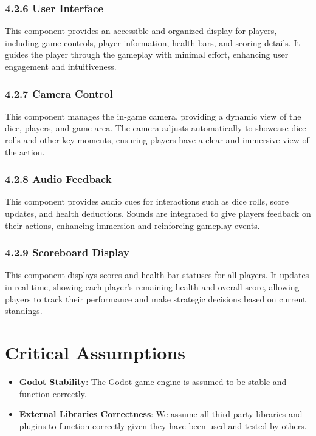 \documentclass{article}
\begin{document}
\subsubsection*{4.2.6 User Interface}
This component provides an accessible and organized display for players, including game controls, player information, health bars, and scoring details. It guides the player through the gameplay with minimal effort, enhancing user engagement and intuitiveness.

\subsubsection*{4.2.7 Camera Control}
This component manages the in-game camera, providing a dynamic view of the dice, players, and game area. The camera adjusts automatically to showcase dice rolls and other key moments, ensuring players have a clear and immersive view of the action.

\subsubsection*{4.2.8 Audio Feedback}
This component provides audio cues for interactions such as dice rolls, score updates, and health deductions. Sounds are integrated to give players feedback on their actions, enhancing immersion and reinforcing gameplay events.

\subsubsection*{4.2.9 Scoreboard Display}
This component displays scores and health bar statuses for all players. It updates in real-time, showing each player's remaining health and overall score, allowing players to track their performance and make strategic decisions based on current standings.

\section{Critical Assumptions}

\begin{itemize}
    \item \textbf{Godot Stability}: The Godot game engine is assumed to be stable and function correctly.
    \item \textbf{External Libraries Correctness}: We assume all third party libraries and plugins to function correctly given they have been used and tested by others.
\end{itemize}
\end{document}
